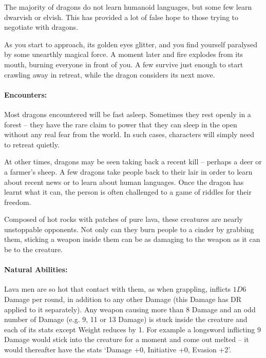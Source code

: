 \begin{multicols}{2}
The majority of dragons do not learn humanoid languages, but some few learn dwarvish or elvish.
This has provided a lot of false hope to those trying to negotiate with dragons.

\begin{boxtext}

	As you start to approach, its golden eyes glitter, and you find yourself paralysed by some unearthly magical force.
A moment later and fire explodes from its mouth, burning everyone in front of you.
	A few survive just enough to start crawling away in retreat, while the dragon considers its next move.

\end{boxtext}

\paragraph{Encounters:} Most dragons encountered will be fast asleep.
Sometimes they rest openly in a forest -- they have the rare claim to power that they can sleep in the open without any real fear from the world.
In such cases, characters will simply need to retreat quietly.

At other times, dragons may be seen taking back a recent kill -- perhaps a deer or a farmer's sheep.
A few dragons take people back to their lair in order to learn about recent news or to learn about human languages.
Once the dragon has learnt what it can, the person is often challenged to a game of riddles for their freedom.  

\dragon

\label{lavaman}

Composed of hot rocks with patches of pure lava, these creatures are nearly unstoppable opponents.  Not only can they burn people to a cinder by grabbing them, sticking a weapon inside them can be as damaging to the weapon as it can be to the creature.

\paragraph{Natural Abilities:} Lava men are so hot that contact with them, as when grappling, inflicts $1D6$ Damage per round, in addition to any other Damage (this Damage has DR applied to it separately).
Any weapon causing more than 8 Damage and an odd number of Damage (e.g. 9, 11 or 13 Damage) is stuck inside the creature and each of its stats except Weight reduces by 1.
For example a longsword inflicting 9 Damage would stick into the creature for a moment and come out melted -- it would thereafter have the stats `Damage +0, Initiative +0, Evasion +2'.


\end{multicols}

